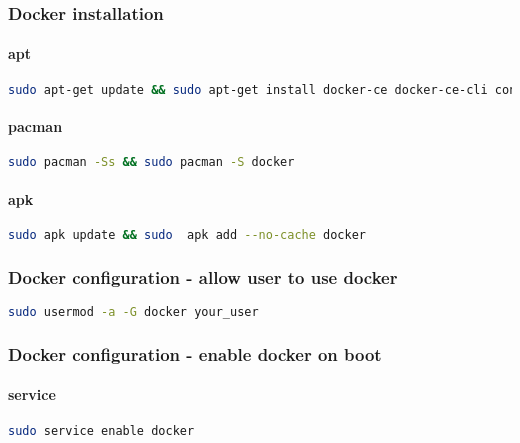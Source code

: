 \subsubsection{Docker installation}

\paragraph{apt}
\begin{flushleft}
\begin{lstlisting}[language=bash,label={lst:apt-docker}]
sudo apt-get update && sudo apt-get install docker-ce docker-ce-cli containerd.io
\end{lstlisting}
\end{flushleft}

\paragraph{pacman}
\begin{flushleft}
\begin{lstlisting}[language=bash,label={lst:pacman-docker}]
sudo pacman -Ss && sudo pacman -S docker
\end{lstlisting}
\end{flushleft}

\paragraph{apk}
\begin{flushleft}
\begin{lstlisting}[language=bash,label={lst:apk-docker}]
sudo apk update && sudo  apk add --no-cache docker
\end{lstlisting}
\end{flushleft}

\subsubsection{Docker configuration - allow user to use docker}
\begin{lstlisting}[language=bash,label={lst:add-group-docker}]
sudo usermod -a -G docker your_user
\end{lstlisting}

\subsubsection{Docker configuration - enable docker on boot}
\paragraph{service}
\begin{flushleft}
\begin{lstlisting}[language=bash,label={lst:service-docker}]
sudo service enable docker
\end{lstlisting}
\end{flushleft}

